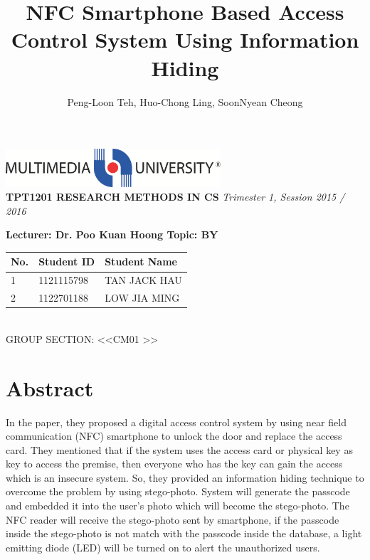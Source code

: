 \documentclass[a4paper, 12pt]{article}
\title{NFC Smartphone Based Access Control System Using Information Hiding}
\author{Peng-Loon Teh, Huo-Chong Ling, SoonNyean Cheong}
\date{}
\begin{document}
\begin{center}
\includegraphics[width=8cm]{mmulogo.eps}\\
\hfill \break
\textbf{
\LARGE TPT1201 \break\break
RESEARCH METHODS IN CS \break\break
}
\textit{Trimester 1, Session 2015 / 2016} \break\break

\textbf{
\Large
Lecturer: Dr. Poo Kuan Hoong \break\break
Topic:  \break\break
BY  \break\break
}  \break

\begin{tabular}{|l|l|l|}
\hline
No. & Student ID & Student Name\\
\hline
1 & 1121115798 & TAN JACK HAU\\
\hline
2 & 1122701188 & LOW JIA MING\\
\hline
\end{tabular}
\\

GROUP SECTION: \textless\textless CM01 \textgreater\textgreater

\end{center}

\newpage


\tableofcontents
\maketitle

\section{Abstract}
\hspace{1cm}In the paper, they proposed a digital access control system by using near field communication (NFC) smartphone to unlock the door and replace the access card. They mentioned that if the system uses the access card or physical key as key to access the premise, then everyone who has the key can gain the access which is an insecure system. So, they provided an information hiding technique to overcome the problem by using stego-photo. System will generate the passcode and embedded it into the user’s photo which will become the stego-photo. The NFC reader will receive the stego-photo sent by smartphone, if the passcode inside the stego-photo is not match with the passcode inside the database, a light emitting diode (LED) will be turned on to alert the unauthorized users. 
\end{document}
